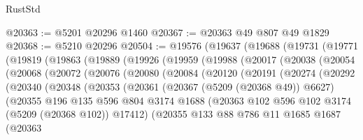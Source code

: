 \begin{lexlean}{RustStd}
\begin{coremodule}
@20363 := @5201 @20296 @1460
@20367 := @20363 @49 @807 @49 @1829
@20368 := @5210 @20296
@20504 := @19576
    (@19637
      (@19688
        (@19731
          (@19771
            (@19819
              (@19863
                (@19889
                  (@19926
                    (@19959
                      (@19988
                        (@20017
                          (@20038
                            (@20054
                              (@20068
                                (@20072
                                  (@20076
                                    (@20080
                                      (@20084
                                        (@20120
                                          (@20191
                                            (@20274
                                              (@20292
                                                (@20340
                                                  (@20348
                                                    (@20353
                                                      (@20361
                                                        (@20367 (@5209 (@20368 @49)) @6627)
                                                        (@20355
                                                          @196
                                                          @135
                                                          @596
                                                          @804
                                                          @3174
                                                          @1688
                                                          (@20363
                                                            @102
                                                            @596
                                                            @102
                                                            @3174
                                                            (@5209 (@20368 @102))
                                                            @17412)
                                                          (@20355
                                                            @133
                                                            @88
                                                            @786
                                                            @11
                                                            @1685
                                                            @1687
                                                            (@20363

\end{coremodule}
\end{lexlean}
